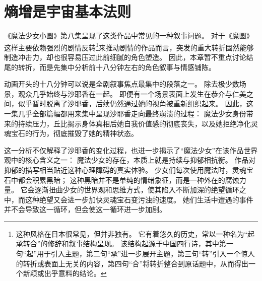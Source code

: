 \chapter[熵增是宇宙基本法则]{熵增是宇宙基本法则}



《魔法少女小圆》第八集呈现了这类作品中常见的一种叙事问题。
对于《魔圆》这样主要依赖强烈的剧情反转\footnote{%
    这种风格在日本很常见，但并非独有。
    它有着悠久的历史，常以一种名为“起承转合”的修辞和叙事结构呈现。
    该结构起源于中国四行诗，其中第一句“起”用于引入主题，第二句“承”进一步展开主题，第三句“转”引入一个惊人的转折或表面上无关的内容，第四句“合”将转折整合到原话题中，从而得出一个新颖或出乎意料的结论。
}来推动剧情的作品而言，突发的重大转折固然能够制造冲击力，却也很容易压过此前细腻的角色塑造\cite{maynard1997communication-strategies}。
因此，本章暂不重点讨论结尾的转折，而是先集中分析前十八分钟左右的角色叙事与情感铺陈。

动画开头的十八分钟可以说是全剧叙事焦点最集中的段落之一。
除去极少数场景，观众几乎始终与沙耶香在一起。
即便有一个场景表面上发生在恭介与仁美之间，似乎暂时脱离了沙耶香，后续仍然通过她的视角被重新组织起来。
因此，这一集几乎全部篇幅都用来集中呈现沙耶香走向最终崩溃的过程：
魔法少女身份带来的持续压力，丘比揭示身体真相后她自我价值感的彻底丧失，以及她拒绝净化灵魂宝石的行为，彻底摧毁了她的精神状态。

这一分析不仅解释了沙耶香的变化过程，也进一步揭示了“魔法少女”在该作品世界观中的核心含义之一：
魔法少女的存在，本质上就是持续与抑郁相抗衡。
作品对抑郁的描写相当贴近这种心理障碍的真实体验。
少女们每次使用魔法时，灵魂宝石中都会积累黑暗；
这种黑暗并不是单纯的情绪象征，而是一种外在的腐蚀力量。
它会逐渐扭曲少女的世界观和思维方式，使其陷入不断加深的绝望循环之中，而这种绝望又会进一步加快灵魂宝石变污浊的速度。
她们生活中遭遇的事件并不会导致这一循环，但会使这一循环进一步加剧\cite{apa2000dsm-iv-tr}。

